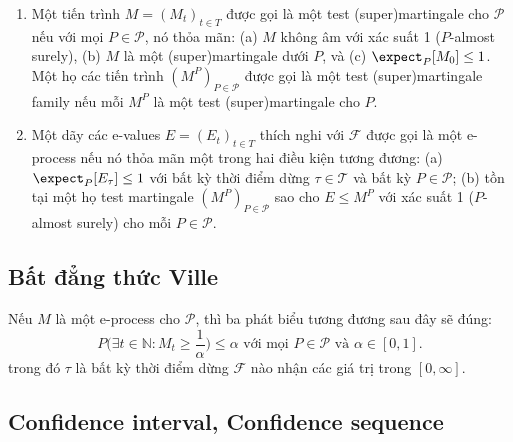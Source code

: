 \begin{defn}
  \begin{enumerate}[label=(\roman*)]
    \item Một tiến trình $M = (M_t)_{t \in T}$ được gọi là một test
      (super)martingale cho $\mathcal{P}$ nếu với mọi $P \in \mathcal{P}$, nó
      thỏa mãn: (a) $M$ không âm với xác suất 1 ($P$-almost surely), (b) $M$ là
      một (super)martingale dưới $P$, và (c) $\expect_P[M_0] \leq 1$. Một họ
      các tiến trình $(M^P)_{P \in \mathcal{P}}$ được gọi là một test
      (super)martingale family nếu mỗi $M^P$ là một test (super)martingale cho
      $P$.

    \item Một dãy các e-values $E = (E_t)_{t \in T}$ thích nghi với
      $\mathcal{F}$ được gọi là một e-process nếu nó thỏa mãn một trong hai
      điều kiện tương đương: (a) $\expect_P[E_\tau] \leq 1$ với bất kỳ thời
      điểm dừng $\tau \in \mathcal{T}$ và bất kỳ $P \in \mathcal{P}$; (b) tồn
      tại một họ test martingale $(M^P)_{P \in \mathcal{P}}$ sao cho $E \leq
      M^P$ với xác suất 1 ($P$-almost surely) cho mỗi $P \in \mathcal{P}$.
  \end{enumerate}
\end{defn}

\subsection{Bất đẳng thức Ville}

\begin{thm}
  Nếu $M$ là một e-process cho $\mathcal{P}$, thì ba phát biểu tương đương sau
  đây sẽ đúng: \begin{equation}
    P\biggl( \exists t \in \mathbb{N} : M_t \geq \frac{1}{\alpha} \biggr)
    \leq \alpha \text{ với mọi } P \in \mathcal{P} \text{ và } \alpha \in [0,
    1].
  \end{equation} trong đó $\tau$ là bất kỳ thời điểm dừng $\mathcal{F}$ nào
  nhận các giá trị trong $[0, \infty]$.
\end{thm}

\subsection{Confidence interval, Confidence sequence}

